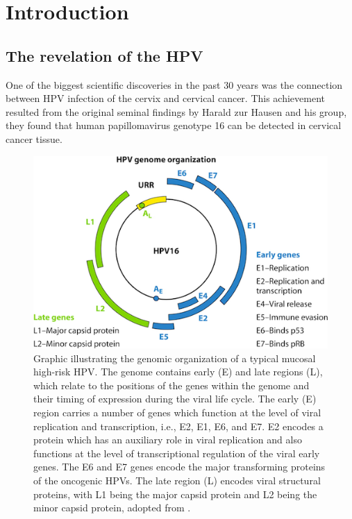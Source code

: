 
\chapter{Introduction}\label{intro}

\section{The revelation of the HPV}
One of the biggest scientific discoveries in the past 30 years was the connection between HPV infection of the cervix and cervical cancer. This achievement resulted from the original seminal findings by Harald zur Hausen and his group, they found that human papillomavirus genotype 16 can be detected in cervical cancer tissue. 
\begin{figure}[ht]
	\centering
	\includegraphics[scale=0.7]{IMG/genoma.png}
	\caption{Graphic illustrating the genomic organization of a typical mucosal high-risk HPV. The genome contains early (E) and late regions (L), which relate to the positions of the genes within the genome and their timing of expression during the viral life cycle. The early (E) region carries a number of genes which function at the level of viral replication and transcription, i.e., E2, E1, E6, and E7. E2 encodes a protein which has an auxiliary role in viral replication and also functions at the level of transcriptional regulation of the viral early genes. The E6 and E7 genes encode the major transforming proteins of the oncogenic HPVs. The late region (L) encodes viral structural proteins, with L1 being the major capsid protein and L2 being the minor capsid protein, adopted from 
	\cite{Stanley215}.}
	\label{genoma}
\end{figure}

